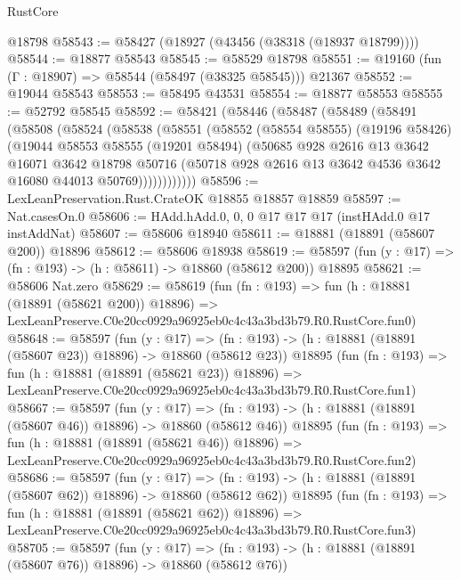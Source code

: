 \begin{lexlean}{RustCore}
\begin{coremodule}
    @18798
@58543 := @58427 (@18927 (@43456 (@38318 (@18937 @18799))))
@58544 := @18877 @58543
@58545 := @58529 @18798
@58551 := @19160 (fun (Γ : @18907) => @58544 (@58497 (@38325 @58545))) @21367
@58552 := @19044 @58543
@58553 := @58495 @43531
@58554 := @18877 @58553
@58555 := @52792 @58545
@58592 := @58421
    (@58446
      (@58487
        (@58489
          (@58491
            (@58508
              (@58524
                (@58538
                  (@58551
                    (@58552
                      (@58554 @58555)
                      (@19196 @58426)
                      (@19044
                        @58553
                        @58555
                        (@19201 @58494)
                        (@50685
                          @928
                          @2616
                          @13
                          @3642
                          @16071
                          @3642
                          @18798
                          @50716
                          (@50718 @928 @2616 @13 @3642 @4536 @3642 @16080 @44013 @50769))))))))))))
@58596 := LexLeanPreservation.Rust.CrateOK @18855 @18857 @18859
@58597 := Nat.casesOn.{0}
@58606 := HAdd.hAdd.{0, 0, 0} @17 @17 @17 (instHAdd.{0} @17 instAddNat)
@58607 := @58606 @18940
@58611 := @18881 (@18891 (@58607 @200)) @18896
@58612 := @58606 @18938
@58619 := @58597 (fun (y : @17) => (fn : @193) -> (h : @58611) -> @18860 (@58612 @200)) @18895
@58621 := @58606 Nat.zero
@58629 := @58619
    (fun (fn : @193) =>
    fun (h : @18881 (@18891 (@58621 @200)) @18896) =>
    LexLeanPreserve.C0e20cc0929a96925eb0c4c43a3bd3b79.R0.RustCore.fun0)
@58648 := @58597
    (fun (y : @17) =>
    (fn : @193) -> (h : @18881 (@18891 (@58607 @23)) @18896) -> @18860 (@58612 @23))
    @18895
    (fun (fn : @193) =>
    fun (h : @18881 (@18891 (@58621 @23)) @18896) =>
    LexLeanPreserve.C0e20cc0929a96925eb0c4c43a3bd3b79.R0.RustCore.fun1)
@58667 := @58597
    (fun (y : @17) =>
    (fn : @193) -> (h : @18881 (@18891 (@58607 @46)) @18896) -> @18860 (@58612 @46))
    @18895
    (fun (fn : @193) =>
    fun (h : @18881 (@18891 (@58621 @46)) @18896) =>
    LexLeanPreserve.C0e20cc0929a96925eb0c4c43a3bd3b79.R0.RustCore.fun2)
@58686 := @58597
    (fun (y : @17) =>
    (fn : @193) -> (h : @18881 (@18891 (@58607 @62)) @18896) -> @18860 (@58612 @62))
    @18895
    (fun (fn : @193) =>
    fun (h : @18881 (@18891 (@58621 @62)) @18896) =>
    LexLeanPreserve.C0e20cc0929a96925eb0c4c43a3bd3b79.R0.RustCore.fun3)
@58705 := @58597
    (fun (y : @17) =>
    (fn : @193) -> (h : @18881 (@18891 (@58607 @76)) @18896) -> @18860 (@58612 @76))

\end{coremodule}
\end{lexlean}
